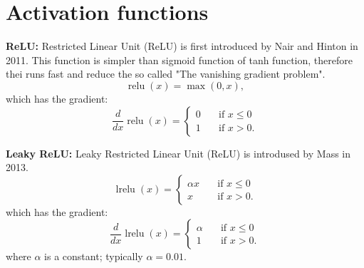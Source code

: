 \documentclass{article}
\DeclareMathOperator{\relu}{relu}
\DeclareMathOperator{\lrelu}{lrelu}
\begin{document}
\section{Activation functions}
\label{sec:actfn}
{\bf ReLU:}
Restricted Linear Unit (ReLU) is first introduced by Nair and Hinton in 2011. This function is simpler than sigmoid function of tanh function, therefore thei runs fast and reduce the so called "The vanishing gradient problem".
\begin{equation}
  \relu(x) = \max(0, x) ,
\end{equation}
which has the gradient:
\begin{equation}
  \frac{d}{dx} \relu(x) =
     \begin{cases}
      0      & \quad \text{if } x \leq  0 \\
      1       & \quad \text{if } x > 0 .
    \end{cases}
\end{equation}

{\bf Leaky ReLU:}
Leaky Restricted Linear Unit (ReLU) is introdused by Mass in 2013.
\begin{equation}
  \lrelu(x) =
    \begin{cases}
      \alpha x      & \quad \text{if } x \leq  0 \\
      x       & \quad \text{if } x > 0 .
    \end{cases}
\end{equation}
which has the gradient:
\begin{equation}
  \frac{d}{dx} \lrelu(x) =
     \begin{cases}
      \alpha      & \quad \text{if } x \leq  0 \\
      1       & \quad \text{if } x > 0 .
    \end{cases}
\end{equation}
where $\alpha$ is a constant; typically $\alpha = 0.01$.
\end{document}
